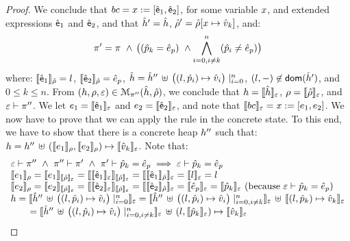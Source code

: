 \begin{proof}
\noindent{}
We conclude that $\bcmd = \jvar := [\pvsexpr_1, \pvsexpr_2]$, for some variable $\jvar$, and extended expressions $\pvsexpr_1$ and $\pvsexpr_2$, 
and that $\sheap' = \sheap$, $\sstore' = \sstore[\jvar \mapsto \sexprv_k]$, and: 
 $$\pc' =  \pc \ \wedge \, \big( (\sexprp_k = \sexpr_p) \ \wedge \bigwedge_{i = 0, i \neq k}^n (\sexprp_i \neq \sexpr_p) \big)$$
 where:
 $\symbeval{\pvsexpr_1}{\sstore} =  \loc$, $\symbeval{\pvsexpr_2}{\sstore} =  \sexpr_p$, 
 $\sheap = \sheap'' \, \uplus \, \big((l, \sexprp_i) \mapsto \sexprv_i\big)\mid_{i = 0}^n$, 
 $(l, -) \not\in \domain(\sheap')$, and $0 \leq k \leq n$. 
%
From $(\heap, \store, \senv) \in \smodels{\sheap, \sstore}{\pc''}$, we conclude that $\heap = \semexpr{\sheap}{\senv}$, $\store = \semexpr{\sstore}{\senv}$, and 
$\senv \vdash \pc''$. 
We let $\jsilexpr_1 = \symbeval{\pvsexpr_1}{\senv}$ and $\jsilexpr_2 = \symbeval{\pvsexpr_2}{\senv}$, and note that $\symbeval{\bcmd}{\senv} = \jvar := [\jsilexpr_1, \jsilexpr_2]$.
We now have to prove that we can apply the  rule in the concrete state.
To this end, we have to show that there is a concrete heap $\heap''$ such that:
$\heap = \heap'' \dunion \hcell{\symbeval{\jsilexpr_1}{\store}}{\symbeval{\jsilexpr_2}{\store}}{\symbeval{\sexprv_k}{\senv}}$. 
Note that: 
$$
\begin{array}{l}
%
\senv \vdash \pc'' \ \wedge \ \pc'' \vdash \pc' \ \wedge \ \pc' \vdash \sexprp_k = \sexpr_p \implies \senv \vdash \sexprp_k = \sexpr_p \\
%
 \symbeval{\jsilexpr_1}{\store} = \symbeval{\jsilexpr_1}{\symbeval{\sstore}{\senv}} = \symbeval{\symbeval{\pvsexpr_1}{\senv}}{\symbeval{\sstore}{\senv}} = \symbeval{\symbeval{\pvsexpr_1}{\sstore}}{\senv} 
    = \symbeval{\loc}{\senv} = \loc \\ 
  \symbeval{\jsilexpr_2}{\store}  = \symbeval{\jsilexpr_2}{\semexpr{\sstore}{\senv}} =  \symbeval{\symbeval{\pvsexpr_2}{\senv}}{\symbeval{\sstore}{\senv}} = \symbeval{\symbeval{\pvsexpr_2}{\sstore}}{\senv}
   =  \symbeval{\sexpr_p}{\senv} = \symbeval{\sexprp_k}{\senv}  \text{ (because $\senv \vdash \sexprp_k = \sexpr_p$)} \\
 \heap = \semexpr{\sheap'' \, \uplus \, \big((l, \sexprp_i) \mapsto \sexprv_i\big)\mid_{i = 0}^n}{\senv} 
       =  \semexpr{\sheap'' \, \uplus \, \big((l, \sexprp_i) \mapsto \sexprv_i\big)\mid_{i = 0, i \neq k}^n}{\senv} \dunion \semexpr{(l, \sexprp_k) \mapsto \sexprv_k}{\senv} \\
         \qquad = \semexpr{\sheap'' \, \uplus \, \big((l, \sexprp_i) \mapsto \sexprv_i\big)\mid_{i = 0, i \neq k}^n}{\senv} \dunion (l, \semexpr{\sexprp_k}{\senv}) \mapsto \semexpr{\sexprv_k}{\senv}  \\ 

\end{array}$$
\end{proof}
